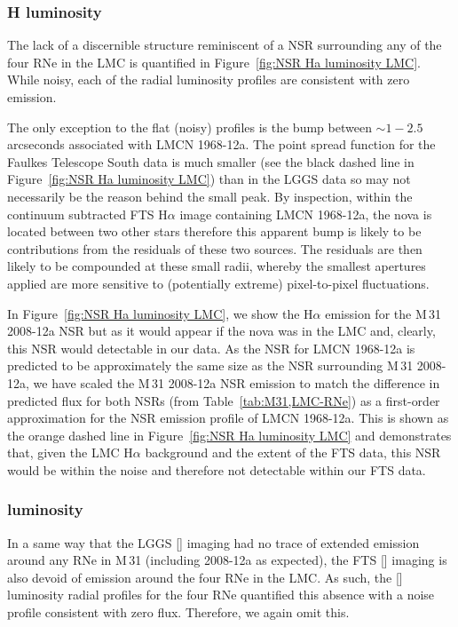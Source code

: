 \documentclass[fleqn,usenatbib]{mnras}
\begin{document}
\subsubsection{H\texorpdfstring{\boldmath{$\alpha$}}{alpha} luminosity}\label{LMC Ha luminosity}
The lack of a discernible structure reminiscent of a NSR surrounding any of the four RNe in the LMC is quantified in Figure~\ref{fig:NSR Ha luminosity LMC}. While noisy, each of the radial luminosity profiles are consistent with zero emission.

The only exception to the flat (noisy) profiles is the bump between ${\sim}1 - 2.5$ arcseconds associated with LMCN 1968-12a. The point spread function for the Faulkes Telescope South data is much smaller (see the black dashed line in Figure~\ref{fig:NSR Ha luminosity LMC}) than in the LGGS data so may not necessarily be the reason behind the small peak. By inspection, within the continuum subtracted FTS H$\alpha$ image containing LMCN 1968-12a, the nova is located between two other stars therefore this apparent bump is likely to be contributions from the residuals of these two sources. The residuals are then likely to be compounded at these small radii, whereby the smallest apertures applied are more sensitive to (potentially extreme) pixel-to-pixel fluctuations.

In Figure~\ref{fig:NSR Ha luminosity LMC}, we show the H$\alpha$ emission for the M\,31 2008-12a NSR but as it would appear if the nova was in the LMC and, clearly, this NSR would detectable in our data. As the NSR for LMCN 1968-12a is predicted to be approximately the same size as the NSR surrounding M\,31 2008-12a, we have scaled the M\,31 2008-12a NSR emission to match the difference in predicted flux for both NSRs (from Table~\ref{tab:M31,LMC-RNe}) as a first-order approximation for the NSR emission profile of LMCN 1968-12a. This is shown as the orange dashed line in Figure~\ref{fig:NSR Ha luminosity LMC} and demonstrates that, given the LMC H$\alpha$ background and the extent of the FTS data, this NSR would be within the noise and therefore not detectable within our FTS data.

\subsubsection{\texorpdfstring{}{$[\ion{O}{iii}]$} luminosity}\label{LMC [OIII] luminosity}
In a same way that the LGGS [] imaging had no trace of extended emission around any RNe in M\,31 (including 2008-12a as expected), the FTS [] imaging is also devoid of emission around the four RNe in the LMC. As such, the [] luminosity radial profiles for the four RNe quantified this absence with a noise profile consistent with zero flux. Therefore, we again omit this.
\end{document}
